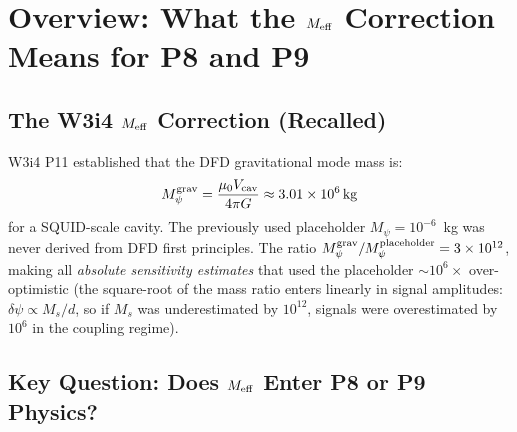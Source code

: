 \documentclass[aps,prd,twocolumn,superscriptaddress,nofootinbib]{revtex4-2}
\begin{document}
\maketitle
\tableofcontents

\section{Overview: What the $M_{\rm eff}$ Correction Means for P8 and P9}
\label{sec:overview}

\subsection{The W3i4 $M_{\rm eff}$ Correction (Recalled)}

W3i4 P11 established that the DFD gravitational mode mass is:
\begin{equation}
M_\psi^{\rm grav} = \frac{\mu_0 V_{\rm cav}}{4\pi G}
\approx 3.01\times10^6\,\mathrm{kg}
\label{eq:Meff}
\end{equation}
for a SQUID-scale cavity. The previously used placeholder
$M_\psi = 10^{-6}$~kg was never derived from DFD first principles.
The ratio $M_\psi^{\rm grav}/M_\psi^{\rm placeholder} = 3\times10^{12}$,
making all \emph{absolute sensitivity estimates} that used the placeholder
$\sim 10^6\times$ over-optimistic (the square-root of the mass ratio
enters linearly in signal amplitudes: $\delta\psi \propto M_s/d$,
so if $M_s$ was underestimated by $10^{12}$, signals were overestimated
by $10^6$ in the coupling regime).

\subsection{Key Question: Does $M_{\rm eff}$ Enter P8 or P9 Physics?}
\end{document}
